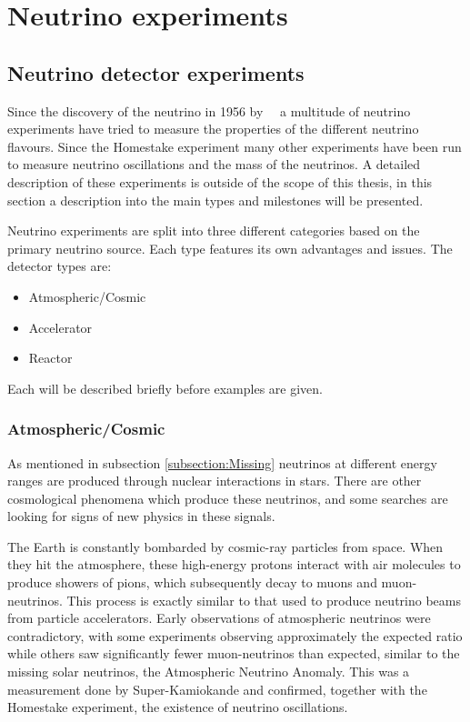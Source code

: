 \chapter{Neutrino  experiments}
\label{c:expIntro}

\section{Neutrino detector experiments}
 
Since the discovery of the neutrino in 1956 by~\citeauthor{6Reines}~\cite{6Reines} a multitude of neutrino experiments have tried to measure the properties of the different neutrino flavours. Since the Homestake experiment many other experiments have been run to measure neutrino oscillations and the mass of the neutrinos. A detailed description of these experiments is outside of the scope of this thesis, in this section a description into the main types and milestones will be presented.

Neutrino experiments are split into three different categories based on the primary neutrino source. Each type features its own advantages and issues.
The detector types are:
\begin{itemize}
\item Atmospheric/Cosmic
\item Accelerator
\item Reactor
\end{itemize}
Each will be described briefly before examples are given.

\subsection{Atmospheric/Cosmic}

As mentioned in subsection \ref{subsection:Missing} neutrinos at different energy ranges are produced through nuclear interactions in stars. There are other cosmological phenomena which produce these neutrinos, and some searches are looking for signs of new physics in these signals. 

The Earth is constantly bombarded by cosmic-ray particles from space. When they hit the atmosphere, these high-energy protons interact with air molecules to produce showers of pions, which subsequently decay to muons and muon-neutrinos. This process is exactly similar to that used to produce neutrino beams from particle accelerators. Early observations of atmospheric neutrinos were contradictory, with some experiments observing approximately the expected ratio while others saw significantly fewer muon-neutrinos than expected, similar to the missing solar neutrinos, the Atmospheric Neutrino Anomaly. This was a measurement done by Super-Kamiokande and confirmed, together with the Homestake experiment, the existence of neutrino oscillations.

